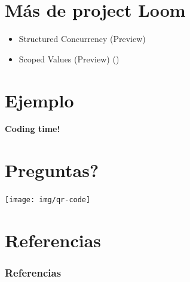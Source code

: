 \documentclass{presentacion}
\begin{document}
\section{Más de project Loom}
\begin{frame}
    \begin{itemize}
        \item Structured Concurrency (Preview) 
        \item Scoped Values (Preview)  \hspace{1em}()
    \end{itemize}

\end{frame}

\section{Ejemplo}
\begin{frame}

    \centering
    \textbf{\Huge{Coding time!} }
\end{frame}


\usebackgroundtemplate{}%
\section{Preguntas?}
\begin{frame}

    \centering
    \texttt{[image: img/qr-code]}
\end{frame}


\section{Referencias}
\begin{frame}[t, allowframebreaks]
\frametitle{Referencias}
\printbibliography
\end{frame}
\end{document}
